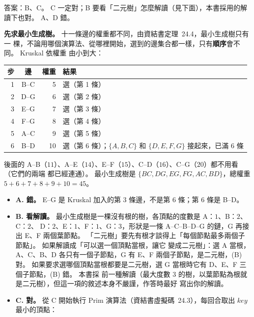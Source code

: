 \begin{pastsoln}
答案：B、C。 C 一定對；B 要看「二元樹」怎麼解讀（見下面），本書採用的解讀下也對。 A、D 錯。

\textbf{先求最小生成樹。} 十一條邊的權重都不同，由資結書定理~24.4，最小生成樹只有一
棵，不論用哪個演算法、從哪裡開始，選到的邊集合都一樣，只有\textbf{順序}會不同。 Kruskal 依權重
由小到大：

\begin{center}
\small
\begin{tabular}{rcrl}
\toprule
步 & 邊 & 權重 & 結果 \\
\midrule
1 & B--C & 5 & 選（第 1 條） \\
2 & D--G & 6 & 選（第 2 條） \\
3 & E--G & 7 & 選（第 3 條） \\
4 & F--G & 8 & 選（第 4 條） \\
5 & A--C & 9 & 選（第 5 條） \\
6 & B--D & 10 & 選（第 6 條）；$\{A, B, C\}$ 和 $\{D, E, F, G\}$ 接起來，已滿 $6$ 條 \\
\bottomrule
\end{tabular}
\end{center}

後面的 A--B（$11$）、A--E（$14$）、E--F（$15$）、C--D（$16$）、C--G（$20$）都不用看（它們的兩端
都已經連通）。 最小生成樹是 $\{BC, DG, EG, FG, AC, BD\}$，總權重 $5 + 6 + 7 + 8 + 9 + 10 = 45$。

\begin{itemize}
\item \textbf{A. 錯。} E--G 是 Kruskal 加入的第 $3$ 條邊，不是第 $6$ 條；第 $6$ 條是 B--D。
\item \textbf{B. 看解讀。} 最小生成樹是一棵沒有根的樹，各頂點的度數是 A：$1$、B：$2$、C：$2$、
D：$2$、E：$1$、F：$1$、G：$3$，形狀是一條 A--C--B--D--G 的鏈，G 再接出 E、F 兩個葉節點。
「二元樹」要先有根才談得上「每個節點最多兩個子節點」。 如果解讀成「可以選一個頂點當根，讓它
變成二元樹」：選 A 當根，A、C、B、D 各只有一個子節點，G 有 E、F 兩個子節點，是二元樹，(B)
對。 如果要求選哪個頂點當根都要是二元樹，選 G 當根時它有 D、E、F 三個子節點，(B) 錯。 本書採
前一種解讀（最大度數 $3$ 的樹，以葉節點為根就是二元樹），但這一項的敘述本身不嚴謹，作答時最好
寫出你的解讀。
\item \textbf{C. 對。} 從 C 開始執行 Prim 演算法（資結書虛擬碼~24.3），每回合取出
$\mathit{key}$ 最小的頂點：


\end{itemize}
\end{pastsoln}
